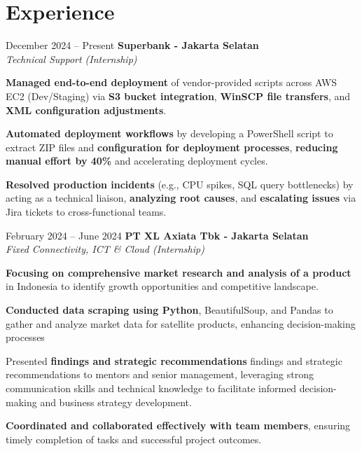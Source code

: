 \documentclass[../main.tex]{subfiles}
\begin{document}
\section{Experience}

\begin{twocolentry}{
		December 2024 – Present}
	\textbf{Superbank \color{Gray}- Jakarta Selatan}\\
	\textit{Technical Support (Internship)}
\end{twocolentry}

\vspace{0.10 cm}
\begin{onecolentry}
	\begin{highlights}
		\item \textbf{Managed end-to-end deployment} of vendor-provided scripts across AWS EC2 (Dev/Staging) via \textbf{S3 bucket integration}, \textbf{WinSCP file transfers}, and \textbf{XML configuration adjustments}.
		\item \textbf{Automated deployment workflows} by developing a PowerShell script to extract ZIP files and \textbf{configuration for deployment processes}, \textbf{reducing manual effort by 40\%} and accelerating deployment cycles.
		\item \textbf{Resolved production incidents} (e.g., CPU spikes, SQL query bottlenecks) by acting as a technical liaison, \textbf{analyzing root causes}, and \textbf{escalating issues} via Jira tickets to cross-functional teams.
	\end{highlights}
\end{onecolentry}

\vspace{0.40 cm}

\begin{twocolentry}{
		February 2024 – June 2024}
	\textbf{PT XL Axiata Tbk \color{Gray} - Jakarta Selatan}\\
	\textit{Fixed Connectivity, ICT \& Cloud (Internship)}
\end{twocolentry}

\vspace{0.10 cm}
\begin{onecolentry}
	\begin{highlights}
		\item \textbf{Focusing on comprehensive market research and analysis of a product} in Indonesia to identify growth opportunities and competitive landscape.
		\item \textbf{Conducted data scraping using Python}, BeautifulSoup, and Pandas to gather and analyze market data for satellite products, enhancing decision-making processes
		\item Presented \textbf{findings and strategic recommendations} findings and strategic recommendations to mentors and senior management, leveraging strong communication skills and technical knowledge to facilitate informed decision-making and business strategy development.
		\item \textbf{Coordinated and collaborated effectively with team members}, ensuring timely completion of tasks and successful project outcomes.
	\end{highlights}
\end{onecolentry}
\end{document}
